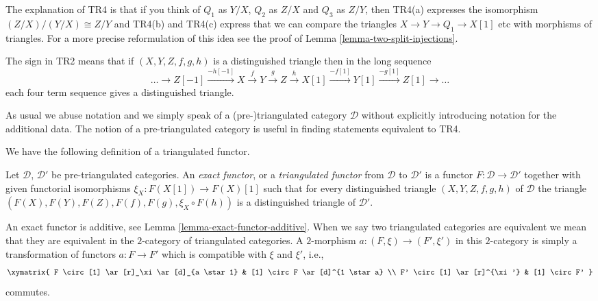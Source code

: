 \noindent
The explanation of TR4 is that if you think of $Q_1$ as
$Y/X$, $Q_2$ as $Z/X$ and $Q_3$ as $Z/Y$, then TR4(a) expresses
the isomorphism $(Z/X)/(Y/X) \cong Z/Y$ and TR4(b) and TR4(c)
express that we can compare the triangles $X \to Y \to Q_1 \to X[1]$
etc with morphisms of triangles. For a more precise reformulation
of this idea see the proof of Lemma \ref{lemma-two-split-injections}.

\medskip\noindent
The sign in TR2 means that if $(X, Y, Z, f, g, h)$ is a distinguished triangle
then in the long sequence
\begin{equation}
\label{equation-rotate}
\ldots \to
Z[-1] \xrightarrow{-h[-1]}
X \xrightarrow{f}
Y \xrightarrow{g}
Z \xrightarrow{h}
X[1] \xrightarrow{-f[1]}
Y[1] \xrightarrow{-g[1]}
Z[1] \to \ldots
\end{equation}
each four term sequence gives a distinguished triangle.

\medskip\noindent
As usual we abuse notation and we simply speak of a (pre-)triangulated
category $\mathcal{D}$ without explicitly introducing notation for the
additional data. The notion of a pre-triangulated category is
useful in finding statements equivalent to TR4.

\medskip\noindent
We have the following definition of a triangulated functor.

\begin{definition}
\label{definition-exact-functor-triangulated-categories}
Let $\mathcal{D}$, $\mathcal{D}'$ be pre-triangulated
categories. An {\it exact functor}, or a {\it triangulated functor}
from $\mathcal{D}$ to $\mathcal{D}'$ is a functor
$F : \mathcal{D} \to \mathcal{D}'$ together
with given functorial isomorphisms $\xi_X : F(X[1]) \to F(X)[1]$
such that for every distinguished triangle
$(X, Y, Z, f, g, h)$ of $\mathcal{D}$ the triangle
$(F(X), F(Y), F(Z), F(f), F(g), \xi_X \circ F(h))$
is a distinguished triangle of $\mathcal{D}'$.
\end{definition}

\noindent
An exact functor is additive, see
Lemma \ref{lemma-exact-functor-additive}.
When we say two triangulated categories are equivalent we mean that
they are equivalent in the $2$-category of triangulated categories.
A $2$-morphism $a : (F, \xi) \to (F', \xi')$ in this $2$-category is
simply a transformation of functors $a : F \to F'$ which is compatible
with $\xi$ and $\xi'$, i.e.,
$$
\xymatrix{
F \circ [1] \ar[r]_\xi \ar[d]_{a \star 1} & [1] \circ F \ar[d]^{1 \star a} \\
F' \circ [1] \ar[r]^{\xi'} & [1] \circ F'
}
$$
commutes.

